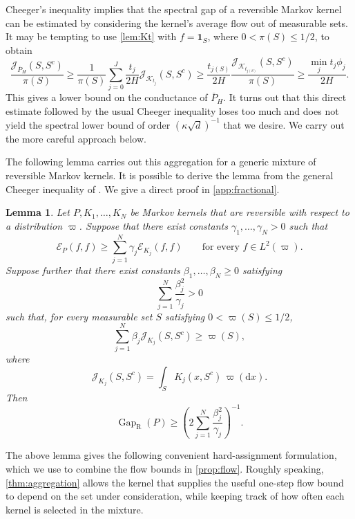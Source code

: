\documentclass[11pt]{article}
\newtheorem{lemma}[lemma]{Lemma}
\newcommand{\Gap}{\operatorname{Gap}_{\mathrm{R}}}
\newcommand{\cE}{\mathcal E}
\newcommand{\cK}{\mathcal K}
\newcommand{\1}{\mathbf 1}
\newcommand{\df}{\mathrm{d}}
\begin{document}
	Cheeger's inequality \citep{LawlerSokal1988} implies that the spectral gap of a reversible Markov kernel can be estimated by considering the kernel's average flow out of measurable sets.
	It may be tempting to use \cref{lem:Kt} with $f = \mathbf{1}_S$, where $0 < \pi(S) \leq 1/2$, to obtain
	\[
	\frac{\mathcal{J}_{\overline P_H}(S, S^c)}{\pi(S)} \geq \frac{1}{\pi(S)} \sum_{j = 0}^J \frac{t_j}{2H} \mathcal{J}_{\cK_{t_j}}(S, S^c) \geq \frac{t_{j(S)}}{2H} \frac{\mathcal{J}_{\cK_{t_{j(S)}}}(S, S^c)}{\pi(S)} \geq \frac{\min_j t_j \phi_j}{2H}.
	\]
	This gives a lower bound on the conductance of $\overline P_H$.
	It turns out that this direct estimate followed by the usual Cheeger
	inequality loses too much and does not yield the spectral lower bound of order $(\kappa \sqrt{d})^{-1}$ that we desire.
	We carry out the more careful approach below.
	
	
	
	
	The following lemma carries out this aggregation for a generic mixture of reversible Markov kernels.   
	It is possible to derive the lemma from the general
	Cheeger inequality of \citet{ChenWang2000}.  We give a direct proof in
	\cref{app:fractional}.
	
	\begin{lemma}
		\label{lem:fractional}
		Let \(P,K_1,\ldots,K_N\) be Markov kernels that are reversible with
		respect to a distribution \(\varpi\).  Suppose that there exist constants
		\(\gamma_1,\ldots,\gamma_N>0\) such that
		\[
		\cE_P(f,f)
		\geq
		\sum_{j=1}^N
		\gamma_j\cE_{K_j}(f,f)
		\qquad
		\text{for every }f\in L^2(\varpi).
		\]
		Suppose further that there exist constants \(\beta_1,\ldots,\beta_N\geq0\)
		satisfying
		\[
		\sum_{j=1}^N\frac{\beta_j^2}{\gamma_j}>0
		\]
		such that, for every measurable set \(S\) satisfying
		\(0<\varpi(S)\leq1/2\),
		\[
		\sum_{j=1}^N
		\beta_j \mathcal{J}_{K_j}(S,S^c)
		\geq
		\varpi(S),
		\]
		where
		\[
		\mathcal{J}_{K_j}(S,S^c)
		=
		\int_S K_j(x,S^c)\,\varpi(\df x).
		\]
		Then
		\[
		\Gap(P)
		\geq
		\left(
		2\sum_{j=1}^N\frac{\beta_j^2}{\gamma_j}
		\right)^{-1}.
		\]
	\end{lemma}
	
	The above lemma gives the following convenient hard-assignment
	formulation, which we use to combine the flow bounds in
	\cref{prop:flow}.
	Roughly speaking, \cref{thm:aggregation}
	allows the kernel that supplies the useful one-step flow bound to depend on
	the set under consideration, while keeping track of how often each kernel
	is selected in the mixture. 
	
\end{document}

